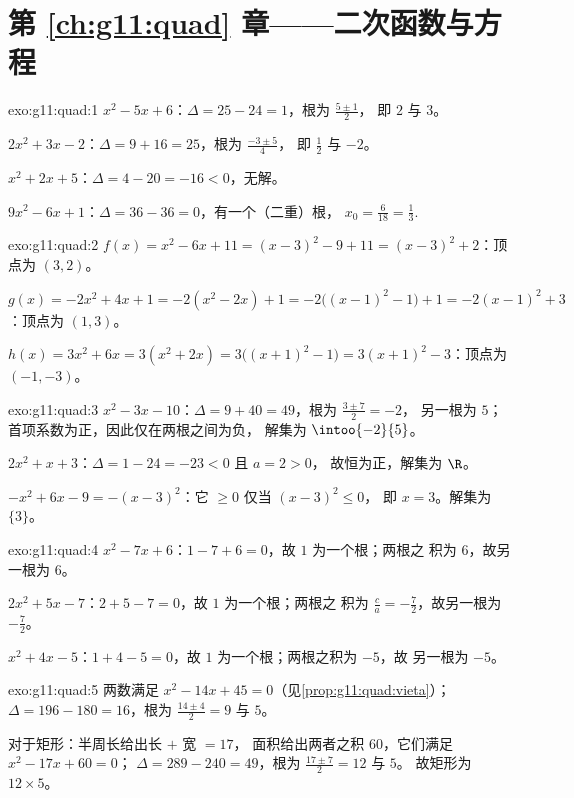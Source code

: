 \section*{第 \ref{ch:g11:quad} 章——二次函数与方程}

\begin{solution}{exo:g11:quad:1}
$x^2-5x+6$：$\Delta = 25 - 24 = 1$，根为 $\frac{5 \pm 1}{2}$，
即 $2$ 与 $3$。

$2x^2+3x-2$：$\Delta = 9 + 16 = 25$，根为 $\frac{-3 \pm 5}{4}$，
即 $\frac12$ 与 $-2$。

$x^2+2x+5$：$\Delta = 4 - 20 = -16 < 0$，无解。

$9x^2-6x+1$：$\Delta = 36 - 36 = 0$，有一个（二重）根，
$x_0 = \frac{6}{18} = \frac13$.
\end{solution}

\begin{solution}{exo:g11:quad:2}
$f(x) = x^2 - 6x + 11 = (x-3)^2 - 9 + 11 = (x-3)^2 + 2$：顶点为 $(3, 2)$。

$g(x) = -2x^2+4x+1 = -2(x^2 - 2x) + 1 = -2\bigl((x-1)^2 - 1\bigr) + 1
= -2(x-1)^2 + 3$：顶点为 $(1, 3)$。

$h(x) = 3x^2 + 6x = 3(x^2 + 2x) = 3\bigl((x+1)^2 - 1\bigr)
= 3(x+1)^2 - 3$：顶点为 $(-1, -3)$。
\end{solution}

\begin{solution}{exo:g11:quad:3}
$x^2 - 3x - 10$：$\Delta = 9 + 40 = 49$，根为 $\frac{3 \pm 7}{2} = -2$，
另一根为 $5$；首项系数为正，因此仅在两根之间为负，
解集为 $\intoo{-2}{5}$。

$2x^2 + x + 3$：$\Delta = 1 - 24 = -23 < 0$ 且 $a = 2 > 0$，
故恒为正，解集为 $\R$。

$-x^2 + 6x - 9 = -(x-3)^2$：它 $\geq 0$ 仅当 $(x-3)^2 \leq 0$，
即 $x = 3$。解集为 $\{3\}$。
\end{solution}

\begin{solution}{exo:g11:quad:4}
$x^2 - 7x + 6$：$1 - 7 + 6 = 0$，故 $1$ 为一个根；两根之
积为 $6$，故另一根为 $6$。

$2x^2 + 5x - 7$：$2 + 5 - 7 = 0$，故 $1$ 为一个根；两根之
积为 $\frac{c}{a} = -\frac72$，故另一根为 $-\frac72$。

$x^2 + 4x - 5$：$1 + 4 - 5 = 0$，故 $1$ 为一个根；两根之积为 $-5$，故
另一根为 $-5$。
\end{solution}

\begin{solution}{exo:g11:quad:5}
两数满足 $x^2 - 14x + 45 = 0$（见\cref{prop:g11:quad:vieta}）；
$\Delta = 196 - 180 = 16$，根为 $\frac{14 \pm 4}{2} = 9$ 与 $5$。

对于矩形：半周长给出长 $+$ 宽 $= 17$，
面积给出两者之积 $60$，它们满足 $x^2 - 17x + 60 = 0$；
$\Delta = 289 - 240 = 49$，根为 $\frac{17 \pm 7}{2} = 12$ 与 $5$。
故矩形为 $12 \times 5$。
\end{solution}

